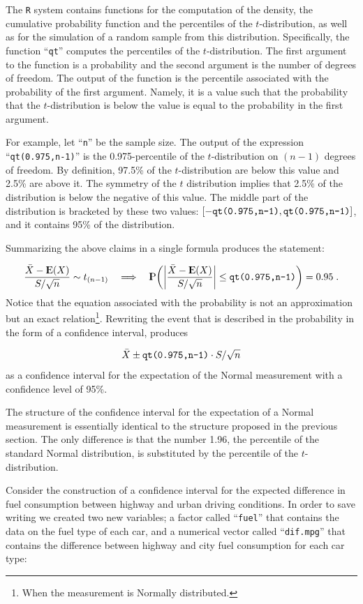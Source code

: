 \documentclass[]{krantz}
\newcommand{\Expec}{{\rm I\kern-.3em E}}
\newcommand{\Prob}{{\rm I\kern-.3em P}}
\theoremstyle{definition}
\theoremstyle{definition}
\theoremstyle{definition}
\theoremstyle{remark}
\begin{document}
The \texttt{R} system contains functions for the computation of the
density, the cumulative probability function and the percentiles of the
\(t\)-distribution, as well as for the simulation of a random sample
from this distribution. Specifically, the function ``\texttt{qt}''
computes the percentiles of the \(t\)-distribution. The first argument
to the function is a probability and the second argument is the number
of degrees of freedom. The output of the function is the percentile
associated with the probability of the first argument. Namely, it is a
value such that the probability that the \(t\)-distribution is below the
value is equal to the probability in the first argument.

For example, let ``\texttt{n}'' be the sample size. The output of the
expression ``\texttt{qt(0.975,n-1)}'' is the 0.975-percentile of the
\(t\)-distribution on \((n-1)\) degrees of freedom. By definition,
97.5\% of the \(t\)-distribution are below this value and 2.5\% are
above it. The symmetry of the \(t\) distribution implies that 2.5\% of
the distribution is below the negative of this value. The middle part of
the distribution is bracketed by these two values:
\([-\mbox{\texttt{qt(0.975,n-1)}}, \mbox{\texttt{qt(0.975,n-1)}}]\), and
it contains 95\% of the distribution.

Summarizing the above claims in a single formula produces the statement:

\[\frac{\bar X - \Expec(X)}{S/\sqrt{n}} \sim t_{(n-1)} \quad \Longrightarrow \quad \Prob \bigg(\bigg|\frac{\bar X - \Expec(X)}{S/\sqrt{n}}\bigg| \leq \mbox{\texttt{qt(0.975,n-1)}} \bigg) = 0.95\;.\]
Notice that the equation associated with the probability is not an
approximation but an exact relation\footnote{When the measurement is
  Normally distributed.}. Rewriting the event that is described in the
probability in the form of a confidence interval, produces

\[\bar X \pm \mbox{\texttt{qt(0.975,n-1)}}\cdot S/ \sqrt{n}\] as a
confidence interval for the expectation of the Normal measurement with a
confidence level of 95\%.

The structure of the confidence interval for the expectation of a Normal
measurement is essentially identical to the structure proposed in the
previous section. The only difference is that the number 1.96, the
percentile of the standard Normal distribution, is substituted by the
percentile of the \(t\)-distribution.

Consider the construction of a confidence interval for the expected
difference in fuel consumption between highway and urban driving
conditions. In order to save writing we created two new variables; a
factor called ``\texttt{fuel}'' that contains the data on the fuel type
of each car, and a numerical vector called ``\texttt{dif.mpg}'' that
contains the difference between highway and city fuel consumption for
each car type:
\end{document}
